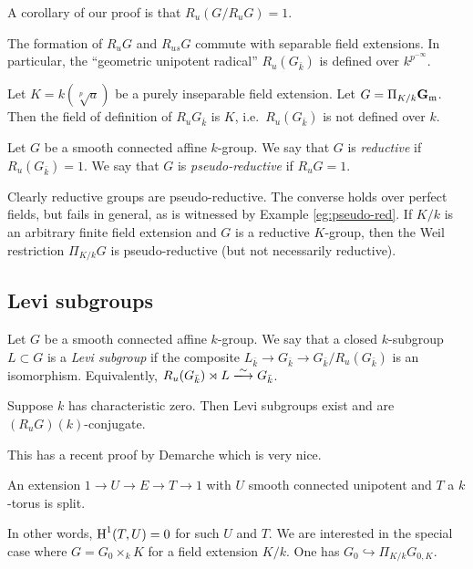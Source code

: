\documentclass{article}
\begin{document}
A corollary of our proof is that $R_u(G/R_u G)=1$. 

\begin{lemma}
The formation of $R_u G$ and $R_{u s} G$ commute with separable field extensions. 
In particular, the ``geometric unipotent radical'' $R_u(G_{\bar k})$ is defined 
over $k^{p^{-\infty}}$. 
\end{lemma}

\begin{example}\label{eg:pseudo-red}
Let $K=k(\sqrt[p] a)$ be a purely inseparable field extension. Let 
$G=\Pi_{K/k} \mathbf{G}_{\mathrm{m}}$. Then the field of definition of 
$R_u G_{\bar k}$ is $K$, i.e.\ $R_u (G_{\bar k})$ is not defined over $k$. 
\end{example}

Let $G$ be a smooth connected affine $k$-group. We say that $G$ is 
\emph{reductive} if $R_u(G_{\bar k})=1$. We say that $G$ is 
\emph{pseudo-reductive} if $R_u G=1$. 

Clearly reductive groups are pseudo-reductive. The converse holds over 
perfect fields, but fails in general, as is witnessed by 
Example \ref{eg:pseudo-red}. If $K/k$ is an arbitrary finite field 
extension and $G$ is a reductive $K$-group, then the Weil restriction 
$\Pi_{K/k} G$ is pseudo-reductive (but not necessarily reductive). 


\subsection{Levi subgroups}

Let $G$ be a smooth connected affine $k$-group. We say that a closed 
$k$-subgroup $L\subset G$ is a \emph{Levi subgroup} if the composite 
$L_{\bar k} \to G_{\bar k} \to G_{\bar k}/R_u(G_{\bar k})$ is an 
isomorphism. Equivalently, 
$R_u(G_{\bar k})\rtimes L\isomorphism G_{\bar k}$. 

\begin{theorem}[Mostow]
Suppose $k$ has characteristic zero. Then Levi subgroups exist and are 
$(R_uG)(k)$-conjugate. 
\end{theorem}

This has a recent proof by Demarche which is very nice. 

\begin{theorem}[SGA 3]
An extension $1 \to U \to E\to T\to 1$ with $U$ smooth connected unipotent and 
$T$ a $k$-torus is split. 
\end{theorem}

In other words, $\operatorname{H}^1(T,U)=0$ for such $U$ and $T$. We are interested in the 
special case where $G=G_0\times_k K$ for a field extension $K/k$. 
One has $G_0\hookrightarrow \Pi_{K/k} G_{0,K}$. 
\end{document}
